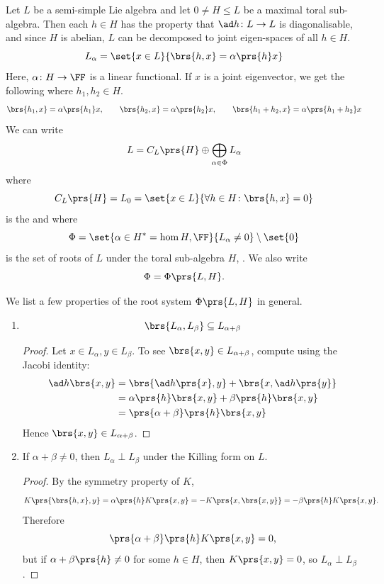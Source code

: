 \documentclass[10pt,a4paper,twoside,openany,hidelinks]{book}
\begin{document}
Let $L$ be a semi-simple Lie algebra and let $0 \neq H \leq L$ be a maximal toral sub-algebra. Then each $h \in H$ has the property that $\ad h \colon L \to L$ is diagonalisable, and since $H$ is abelian, $L$ can be decomposed to joint eigen-spaces of all $h \in H$.
\[L_{\alpha} = \set{x \in L}{\brs{h,x} = \alpha\prs{h}x}\]
Here, $\alpha \colon H \to \FF$ is a linear functional.
If $x$ is a joint eigenvector, we get the following where $h_1,h_2 \in H$.
\begin{align*}
\brs{h_1, x} = \alpha\prs{h_1}x, \qquad \brs{h_2,x} = \alpha\prs{h_2}x, \qquad \brs{h_1 + h_2, x} = \alpha\prs{h_1 + h_2}x
\end{align*}
We can write
\begin{align*}
L = C_L\prs{H} \oplus \bigoplus_{\alpha \in \Phi} L_{\alpha}
\end{align*}
where
\[C_L\prs{H} = L_0 = \set{x \in L}{\forall h \in H \colon \brs{h,x} = 0}\]
is the  and where
\[\Phi = \set{\alpha \in H^* = \hom{H,\FF}}{L_{\alpha} \neq 0} \setminus \set{0}\]
is the set of roots of $L$ under the toral sub-algebra $H$, . We also write
\[\Phi = \Phi\prs{L,H}\text{.}\]

We list a few properties of the root system $\Phi\prs{L,H}$ in general.

\begin{enumerate}[label = Property \arabic*.]
\item
\[\brs{L_{\alpha}, L_{\beta}} \subseteq L_{\alpha + \beta}\]
\begin{proof}
Let $x \in L_{\alpha}, y \in L_{\beta}$. To see $\brs{x,y} \in L_{\alpha + \beta}$, compute using the Jacobi identity:
\begin{align*}
\ad h \brs{x,y} &= \brs{\ad h\prs{x}, y} + \brs{x, \ad h \prs{y}} \\&=
\alpha\prs{h}\brs{x,y} + \beta\prs{h}\brs{x,y} \\&= \prs{\alpha + \beta}\prs{h} \brs{x,y}
\end{align*}
Hence $\brs{x,y} \in L_{\alpha + \beta}$.
\end{proof}
\item
If $\alpha + \beta \neq 0$, then $L_{\alpha} \perp L_{\beta}$ under the Killing form on $L$.
\begin{proof}
By the symmetry property of $K$,
\[K\prs{\brs{h,x},y} = \alpha\prs{h} K\prs{x,y} = -K\prs{x,\brs{x,y}} = -\beta\prs{h} K\prs{x,y} \text{.}\]
Therefore \[\prs{\alpha + \beta}\prs{h} K\prs{x,y} = 0 \text{,}\]
but if $\alpha + \beta\prs{h} \neq 0$ for some $h \in H$, then $K\prs{x,y} = 0$, so $L_{\alpha} \perp L_{\beta}$.
\end{proof}
\end{enumerate}
\end{document}

